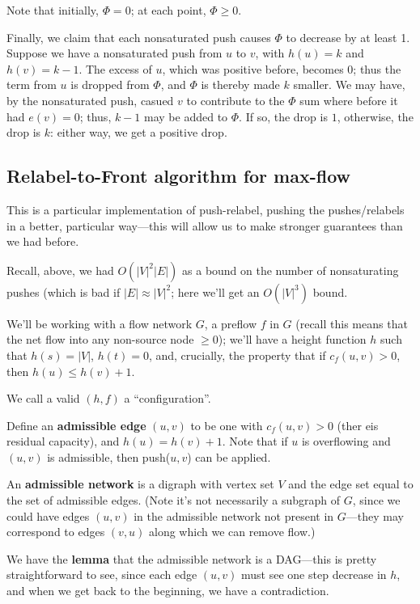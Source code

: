 \documentclass{article}
\begin{document}
Note that
initially, $\Phi = 0$; at each point, $\Phi \geq 0$.

Finally, we claim that each nonsaturated push causes $\Phi$ to 
decrease by at least 1.
Suppose we have a nonsaturated push from $u$ to $v$, with $h(u) = k$ and
$h(v) = k-1$.
The excess of $u$, which was positive before, becomes 0; thus the term
from $u$ is dropped from $\Phi$, and $\Phi$ is thereby made $k$ smaller.
We may have, by the nonsaturated push, casued $v$ to contribute to the
$\Phi$ sum where before it had $e(v) = 0$; thus, $k-1$ may be added to
$\Phi$. If so, the drop is $1$, otherwise, the drop is $k$: either way,
we get a positive drop.






\subsection{Relabel-to-Front algorithm for max-flow}

This is a particular implementation of push-relabel, pushing the
pushes/relabels in a better, particular way---this will allow us to make
stronger guarantees than we had before.

Recall, above, we had $O(|V|^2|E|)$ as a bound on the number of
nonsaturating pushes (which is bad if $|E|\approx|V|^2$; here we'll
get an $O(|V|^3)$ bound.


We'll be working with a flow network $G$, a preflow $f$ in $G$ 
(recall this means that the net flow into any non-source node $\geq 0$);
we'll have a height function $h$ such that $h(s) = |V|$, $h(t)= 0$, and,
crucially, the property that if $c_f(u,v) > 0$, then $h(u) \leq h(v) + 1$.

We call a valid $(h,f)$ a ``configuration''.

Define an \textbf{admissible edge} $(u,v)$ to be one with
$c_f(u,v) > 0$ (ther eis residual capacity), and $h(u) = h(v) + 1$.
Note that if $u$ is overflowing and $(u, v)$ is admissible, then
push($u,v$) can be applied.

An \textbf{admissible network} is a digraph with vertex set $V$ and the
edge set equal to the set of admissible edges.
(Note it's not necessarily a subgraph of $G$, since we could have edges $(u,v)$
in the admissible network not present in $G$---they may correspond to edges
$(v,u)$ along which we can remove flow.)

We have the \textbf{lemma} that the admissible network is a DAG---this is
pretty straightforward to see, since each edge $(u,v)$ must see one step
decrease in $h$, and when we get back to the beginning, we have a 
contradiction.
\end{document}
